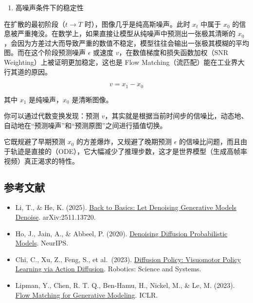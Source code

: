 \begin{enumerate}
\def\labelenumi{\arabic{enumi}.}
\setcounter{enumi}{2}
\tightlist
\item
  高噪声条件下的稳定性
\end{enumerate}

在扩散的最初阶段（\(t\to T\) 时），图像几乎是纯高斯噪声。此时 \(x_t\) 中属于 \(x_0\) 的信息被严重掩没。在数学上，如果直接让模型从纯噪声中预测出一张极其清晰的 \(x_0\)，会因为方差过大而导致严重的数值不稳定，模型往往会输出一张极其模糊的平均图。而在这个阶段预测噪声 \(\epsilon\) 或速度 \(v\)，在数值梯度和损失函数加权（SNR Weighting）上被证明更加稳定，这也是 Flow Matching（流匹配）能在工业界大行其道的原因。

\[
v=x_1-x_0
\]

其中 \(x_1\) 是纯噪声，\(x_0\) 是清晰图像。

你可以通过代数变换发现：预测 \(v\)，其实就是根据当前时间步的信噪比，动态地、自动地在``预测噪声''和``预测原图''之间进行插值切换。

它既规避了早期预测 \(x_0\) 的方差爆炸，又规避了晚期预测 \(\epsilon\) 的信噪比问题，而且由于轨迹是直接的（ODE），它大幅减少了推理步数，这才是世界模型（生成高帧率视频）真正渴求的特性。

\FloatBarrier
{}
\hypertarget{ux53c2ux8003ux6587ux732e-133}{%
\subsection{参考文献}\label{ux53c2ux8003ux6587ux732e-133}}

\vspace{0.25em}
\begin{itemize}
\tightlist
\item
  Li, T., \& He, K. (2025). \href{https://arxiv.org/abs/2511.13720}{Back to Basics: Let Denoising Generative Models Denoise}. arXiv:2511.13720.
\item
  Ho, J., Jain, A., \& Abbeel, P. (2020). \href{https://arxiv.org/abs/2006.11239}{Denoising Diffusion Probabilistic Models}. NeurIPS.
\item
  Chi, C., Xu, Z., Feng, S., et al.~(2023). \href{https://arxiv.org/abs/2303.04137}{Diffusion Policy: Visuomotor Policy Learning via Action Diffusion}. Robotics: Science and Systems.
\item
  Lipman, Y., Chen, R. T. Q., Ben-Hamu, H., Nickel, M., \& Le, M. (2023). \href{https://arxiv.org/abs/2210.02747}{Flow Matching for Generative Modeling}. ICLR.
\end{itemize}

\clearpage

